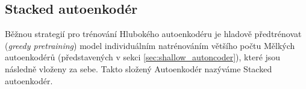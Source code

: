\subsection{Stacked autoenkodér}
\label{sec:stacked_autoencoder}
Běžnou strategií pro trénování Hlubokého autoenkodéru je hladově předtrénovat (\emph{greedy pretraining}) model individuálním natrénováním většího počtu Mělkých autoenkodérů (představených v sekci \autoref{sec:shallow_autoncoder}), které jsou následně vloženy za sebe.
Takto složený Autoenkodér nazýváme Stacked autoenkodér.